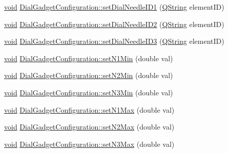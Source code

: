 \begin{DoxyCompactItemize}
\item 
\hyperlink{group___u_a_v_objects_plugin_ga444cf2ff3f0ecbe028adce838d373f5c}{void} \hyperlink{group___dial_plugin_ga348ba33a6676d7777a8fb313029f71a0}{\-Dial\-Gadget\-Configuration\-::set\-Dial\-Needle\-I\-D1} (\hyperlink{group___u_a_v_objects_plugin_gab9d252f49c333c94a72f97ce3105a32d}{\-Q\-String} element\-I\-D)
\item 
\hyperlink{group___u_a_v_objects_plugin_ga444cf2ff3f0ecbe028adce838d373f5c}{void} \hyperlink{group___dial_plugin_ga10bf865d3762437b52c122ca25827bf1}{\-Dial\-Gadget\-Configuration\-::set\-Dial\-Needle\-I\-D2} (\hyperlink{group___u_a_v_objects_plugin_gab9d252f49c333c94a72f97ce3105a32d}{\-Q\-String} element\-I\-D)
\item 
\hyperlink{group___u_a_v_objects_plugin_ga444cf2ff3f0ecbe028adce838d373f5c}{void} \hyperlink{group___dial_plugin_gaa9309c52e9b730a340f1c28ec1dc8a51}{\-Dial\-Gadget\-Configuration\-::set\-Dial\-Needle\-I\-D3} (\hyperlink{group___u_a_v_objects_plugin_gab9d252f49c333c94a72f97ce3105a32d}{\-Q\-String} element\-I\-D)
\item 
\hyperlink{group___u_a_v_objects_plugin_ga444cf2ff3f0ecbe028adce838d373f5c}{void} \hyperlink{group___dial_plugin_ga012a4909a3cf65e08b6b5891fa2ccf4a}{\-Dial\-Gadget\-Configuration\-::set\-N1\-Min} (double val)
\item 
\hyperlink{group___u_a_v_objects_plugin_ga444cf2ff3f0ecbe028adce838d373f5c}{void} \hyperlink{group___dial_plugin_ga554dde8a86360b5dc635b42a4cf2ae9d}{\-Dial\-Gadget\-Configuration\-::set\-N2\-Min} (double val)
\item 
\hyperlink{group___u_a_v_objects_plugin_ga444cf2ff3f0ecbe028adce838d373f5c}{void} \hyperlink{group___dial_plugin_ga91592b4ed5f14cfe3a86cd4aca76772e}{\-Dial\-Gadget\-Configuration\-::set\-N3\-Min} (double val)
\item 
\hyperlink{group___u_a_v_objects_plugin_ga444cf2ff3f0ecbe028adce838d373f5c}{void} \hyperlink{group___dial_plugin_ga33eb2b4ead9a0ca8a72912fa67dd8c30}{\-Dial\-Gadget\-Configuration\-::set\-N1\-Max} (double val)
\item 
\hyperlink{group___u_a_v_objects_plugin_ga444cf2ff3f0ecbe028adce838d373f5c}{void} \hyperlink{group___dial_plugin_gaff758445779de3b3d7830a3fb88b7bd9}{\-Dial\-Gadget\-Configuration\-::set\-N2\-Max} (double val)
\item 
\hyperlink{group___u_a_v_objects_plugin_ga444cf2ff3f0ecbe028adce838d373f5c}{void} \hyperlink{group___dial_plugin_ga56e1a76d56367c9fcbeb323249e2f312}{\-Dial\-Gadget\-Configuration\-::set\-N3\-Max} (double val)

\end{DoxyCompactItemize}
